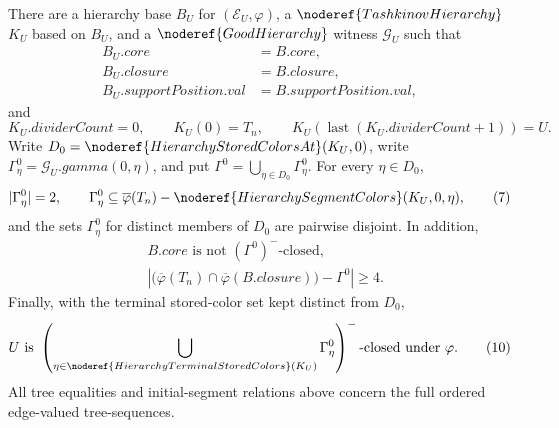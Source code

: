 \begin{theorem}
There are a hierarchy base \(B_U\) for \((\mathcal E_U,\varphi)\), a
\(\noderef{TashkinovHierarchy}\) \(K_U\) based on \(B_U\), and a
\(\noderef{GoodHierarchy}\) witness \(\mathcal G_U\) such that
\[
 \begin{split}
 B_U.\mathit{core}&=B.\mathit{core},\\
 B_U.\mathit{closure}&=B.\mathit{closure},\\
 B_U.\mathit{supportPosition.val}&=B.\mathit{supportPosition.val},
 \end{split}                                                     \tag{5}
\]
and
\[
 K_U.\mathit{dividerCount}=0,\qquad K_U(0)=T_n,
 \qquad K_U(\operatorname{last}(K_U.\mathit{dividerCount}+1))=U. \tag{6}
\]
Write \(D_0=\noderef{HierarchyStoredColorsAt}(K_U,0)\), write
\(\Gamma^0_\eta=\mathcal G_U.\mathit{gamma}(0,\eta)\), and put
\(\Gamma^0=\bigcup_{\eta\in D_0}\Gamma^0_\eta\).  For every
\(\eta\in D_0\),
\[
 |\Gamma^0_\eta|=2,
 \qquad
 \Gamma^0_\eta\subseteq
 \overline\varphi(T_n)-
   \noderef{HierarchySegmentColors}(K_U,0,\eta),                 \tag{7}
\]
and the sets \(\Gamma^0_\eta\) for distinct members of \(D_0\) are
pairwise disjoint.  In addition,
\[
 \begin{split}
 &B.\mathit{core}\text{ is not }(\Gamma^0)^-\text{-closed},     \tag{8}\\
 &\left|\bigl(\overline\varphi(T_n)\cap
       \overline\varphi(B.\mathit{closure})\bigr)-\Gamma^0\right|
       \geq4.                                                    \tag{9}
 \end{split}
\]
Finally, with the terminal stored-color set kept distinct from \(D_0\),
\[
 U\text{ is }
 \left(\bigcup_{\eta\in
      \noderef{HierarchyTerminalStoredColors}(K_U)}
      \Gamma^0_\eta\right)^-\text{-closed under }\varphi.      \tag{10}
\]
All tree equalities and initial-segment relations above concern the full
ordered edge-valued tree-sequences.
\end{theorem}

